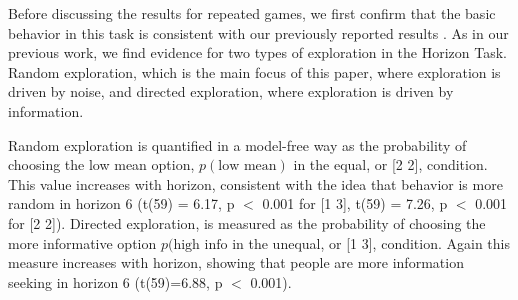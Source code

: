 \documentclass[12pt]{article}
\begin{document}
	
	
	
	Before discussing the results for repeated games, we first confirm that the basic behavior in this task is consistent with our previously reported results \citep{wilson2014}. As in our previous work, we find evidence for two types of exploration in the Horizon Task.  Random exploration, which is the main focus of this paper, where exploration is driven by noise, and directed exploration, where exploration is driven by information. 
	
	Random exploration is quantified in a model-free way as the probability of choosing the low mean option, $p(\mbox{low mean})$ in the equal, or [2 2], condition. This value increases with horizon, consistent with the idea that behavior is more random in horizon 6 (t(59) = 6.17, p $<$ 0.001 for [1 3], t(59) = 7.26, p $<$ 0.001 for [2 2]).  Directed exploration, is measured as the probability of choosing the more informative option $p(\mbox{high info}$ in the unequal, or [1 3], condition. Again this measure increases with horizon, showing that people are more information seeking in horizon 6 (t(59)=6.88, p $<$ 0.001).
	
\end{document}
